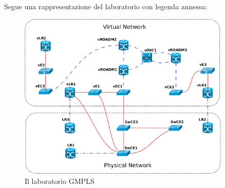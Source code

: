 \documentclass[10pt,a4paper]{report}
\begin{document}
Segue una rappresentazione del laboratorio con legenda annessa:

\newpage

\begin{figure}[!htbp]
  \begin{center}
    \includegraphics[width=0.9\textwidth]{img/testbed_model}
    \caption[]{Il laboratorio GMPLS}
  \end{center}
\end{figure}
 
\end{document}
